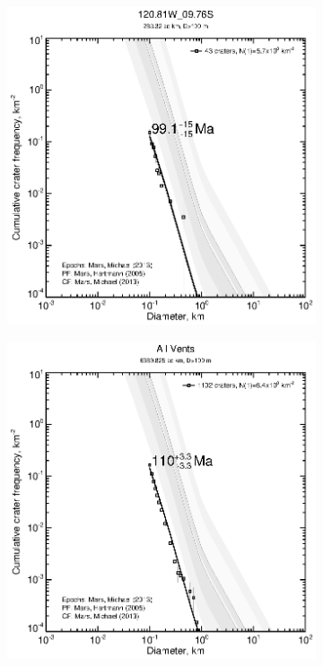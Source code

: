 \documentclass[12pt,letter]{article}
\begin{document}
\begin{figure}
\centering
\begin{subfigure}{.33\textwidth}
  \includegraphics[width=\linewidth,clip,trim=1cm 1cm 1.5cm 1cm]{figures/craterstats/120-81W_09-76S_100m_cum.eps}
\end{subfigure}%
\begin{subfigure}{.33\textwidth}
  \includegraphics[width=\linewidth,clip,trim=1cm 1cm 1.5cm 1cm]{figures/craterstats/arsia_all29_cum.eps}

\end{subfigure}
\end{figure}
\end{document}
